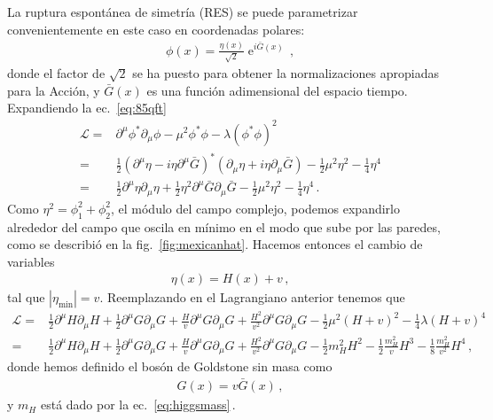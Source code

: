 La ruptura espontánea de simetría (RES) se puede parametrizar convenientemente en este caso en coordenadas polares:
\begin{align}
  \phi(x)=\frac{\eta(x)}{\sqrt{2}} \operatorname{e}^{i\bar{G}(x)}\,,
\end{align}
donde el factor de $\sqrt{2}$ se ha puesto para obtener la normalizaciones apropiadas para la Acción, y $\bar{G}(x)$ es una función adimensional del espacio tiempo. Expandiendo la ec.~\eqref{eq:85qft}
\begin{align}
    \mathcal{L}=&\partial^\mu\phi^*\partial_\mu\phi-\mu^2\phi^*\phi-\lambda(\phi^*\phi)^2 \nonumber\\
=&\frac{1}{2}\left( \partial^{\mu}\eta-i\eta \partial^{\mu}\bar{G} \right)^{*}\left(\partial_{\mu}\eta+i\eta \partial_{\mu}\bar{G}  \right)
-\frac{1}{2}\mu^2 \eta^2 -\frac{1}{4}\eta^4 \nonumber\\
=&\frac{1}{2}\partial^{\mu}\eta\partial_{\mu}\eta+\frac{1}{2}\eta^2 \partial^{\mu}\bar{G}\partial_{\mu}\bar{G} 
-\frac{1}{2}\mu^2 \eta^2 -\frac{1}{4}\eta^4 \,.
\end{align}
 Como $\eta^2=\phi_1^2+\phi_2^2$, el módulo del campo complejo, podemos expandirlo  alrededor del campo que oscila en mínimo en el modo que sube por las paredes, como se describió en la fig.~\ref{fig:mexicanhat}. Hacemos entonces el cambio de variables
 \begin{align}
   \eta(x)=H(x)+v\,,
 \end{align}
tal que $|\eta_{\text{min}}|=v$. Reemplazando en el Lagrangiano anterior tenemos que
\begin{align}
  \mathcal{L}=&\frac{1}{2}\partial^{\mu}H\partial_{\mu}H+\frac{1}{2}\partial^{\mu}G\partial_{\mu}G+\frac{H}{v}\partial^{\mu}G\partial_{\mu}G+\frac{H^2}{v^2}\partial^{\mu}G\partial_{\mu}G
-\tfrac{1}{2}\mu^2(H+v)^2-\tfrac{1}{4}\lambda(H+v)^4 \nonumber\\
=&  \frac{1}{2}\partial^{\mu}H\partial_{\mu}H+\frac{1}{2}\partial^{\mu}G\partial_{\mu}G+\frac{H}{v}\partial^{\mu}G\partial_{\mu}G+\frac{H^2}{v^2}\partial^{\mu}G\partial_{\mu}G-\frac{1}{2}m_H^2H^2-\frac{1}{2}\frac{m_H^2}{v}H^3-\frac{1}{8}\frac{m_H^2}{v^2} H^4\,,
\end{align}
donde hemos definido el bosón de Goldstone sin masa como
\begin{align}
  G(x)=v\bar{G}(x)\,,
\end{align}
y $m_H$ está dado por la ec.~\eqref{eq:higgsmass}\,.

